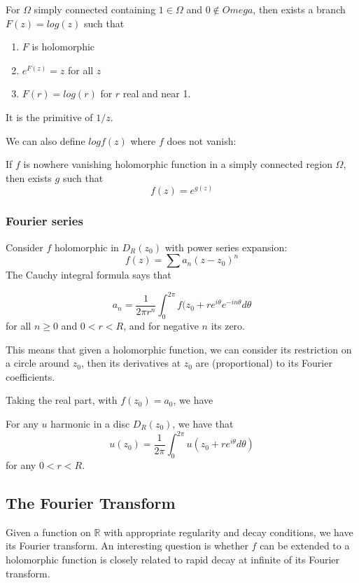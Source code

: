 \documentclass[main.tex]{subfiles}
\begin{document}
\begin{theorem}
For $\Omega$ simply connected containing $1 \in \Omega$ and $0 \nin Omega$, then exists a branch $F(z) = log(z)$ such that
\begin{enumerate}
    \item $F$ is holomorphic
    \item $e^{F(z)} = z$ for all $z$
    \item $F(r) = log(r)$ for $r$ real and near 1.
\end{enumerate}
\end{theorem}
It is the primitive of $1/z$.

We can also define $log f(z)$ where $f$ does not vanish:

\begin{theorem}
If $f$ is nowhere vanishing holomorphic function in a simply connected region $\Omega$, then exists $g$ such that 
$$
f(z) = e^{g(z)}
$$
\end{theorem}

\subsubsection{Fourier series}
Consider $f$ holomorphic in $D_R(z_0)$ with power series expansion:
$$
f(z) = \sum a_n(z-z_0)^n
$$
The Cauchy integral formula says that
\begin{theorem}
$$
a_n = \frac{1}{2\pi r^n} \int_0 ^{2\pi} f(z_0 + r e^{i\theta} e^{-in\theta} d\theta
$$
for all $n \geq 0$ and $0 < r < R$, and for negative $n$ its zero. 
\end{theorem}

This means that given a holomorphic function, we can consider its restriction on a circle around $z_0$, then its derivatives at $z_0$ are (proportional) to its Fourier coefficients.

Taking the real part, with $f(z_0) = a_0$, we have 
\begin{corollary}
For any $u$ harmonic in a disc $D_R(z_0)$, we have that 
$$
u(z_0) = \frac{1}{2\pi}\int_0 ^{2\pi} u(z_0 + re^{i \theta} d\theta)
$$
for any $0 < r < R$.
\end{corollary}

\subsection{The Fourier Transform}
Given a function on $\mathbb{R}$ with appropriate regularity and decay conditions, we have its Fourier transform. An interesting question is whether $f$ can be extended to a holomorphic function is closely related to rapid decay at infinite of its Fourier transform.
\end{document}
